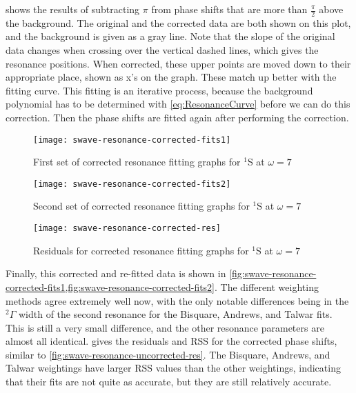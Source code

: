 \documentclass[Dissertation.tex]{subfiles}
\begin{document}
 shows the results of subtracting $\pi$ from phase shifts that are more than $\frac{\pi}{2}$ above the background. The original and the corrected data are both shown on this plot, and the background is given as a gray line. Note that the slope of the original data changes when crossing over the vertical dashed lines, which gives the resonance positions. When corrected, these upper points are moved down to their appropriate place, shown as x's on the graph. These match up better with the fitting curve. This fitting is an iterative process, because the background polynomial has to be determined with \cref{eq:ResonanceCurve} before we can do this correction. Then the phase shifts are fitted again after performing the correction.

\begin{figure}[H]
	\centering
	\texttt{[image: swave-resonance-corrected-fits1]}
	\caption{First set of corrected resonance fitting graphs for $^1$S at $\omega = 7$}
	\label{fig:swave-resonance-corrected-fits1}
\end{figure}

\begin{figure}[H]
	\centering
	\texttt{[image: swave-resonance-corrected-fits2]}
	\caption{Second set of corrected resonance fitting graphs for $^1$S at $\omega = 7$}
	\label{fig:swave-resonance-corrected-fits2}
\end{figure}

\begin{figure}[H]
	\centering
	\texttt{[image: swave-resonance-corrected-res]}
	\caption{Residuals for corrected resonance fitting graphs for $^1$S at $\omega = 7$}
	\label{fig:swave-resonance-corrected-res}
\end{figure}

Finally, this corrected and re-fitted data is shown in \cref{fig:swave-resonance-corrected-fits1,fig:swave-resonance-corrected-fits2}. The different weighting methods agree extremely well now, with the only notable differences being in the $^2\Gamma$ width of the second resonance for the Bisquare, Andrews, and Talwar fits. This is still a very small difference, and the other resonance parameters are almost all identical.  gives the residuals and RSS for the corrected phase shifts, similar to \cref{fig:swave-resonance-uncorrected-res}. The Bisquare, Andrews, and Talwar weightings have larger RSS values than the other weightings, indicating that their fits are not quite as accurate, but they are still relatively accurate.
\end{document}
